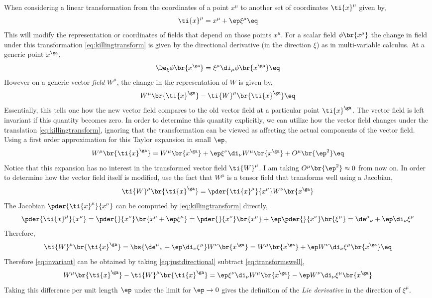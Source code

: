 \documentclass{article}
\begin{document}
When considering a linear transformation from the coordinates of a point $x^\mu$ to another set of coordinates $\ti{x}^\mu$ given by,
\[ \ti{x}^\mu = x^\mu + \ep \xi^\mu \eq \label{eq:killingtransform} \]
This will modify the representation or coordinates of fields that depend on those points $x^\mu$. For a scalar field $\phi \br{x^\mu}$ the change in field under this transformation \eqref{eq:killingtransform} is given by the directional derivative (in the direction $\xi$) as in multi-variable calculus. At a generic point $x^\ga$,
\[ \De_{\xi}\phi\br{x^\ga} = \xi^\mu \di_\mu \phi\br{x^\ga} \eq \label{eq:scalardirectional} \]
However on a generic vector \textit{field} $W^\mu$, the change in the representation of $W$ is given by,
\[ W^\mu \br{\ti{x}^\ga} - \ti{W}^\mu \br{\ti{x}^\ga} \eq \label{eq:invariant} \]
Essentially, this tells one how the new vector field compares to the old vector field at a particular point $\ti{x}^\ga$. The vector field is left invariant if this quantity becomes zero. In order to determine this quantity explicitly, we can utilize how the vector field changes under the translation \eqref{eq:killingtransform}, ignoring that the transformation can be viewed as affecting the actual components of the vector field. Using a first order approximation for this Taylor expansion in small $\ep$,
\[ W^\mu \br{\ti{x}^\ga} = W^\mu \br{x^\ga} + \ep \xi^\nu \di_\nu W^\mu \br{x^\ga} + O^\mu\br{\ep^2}  \eq \label{eq:justdirectional} \]
Notice that this expansion has no interest in the transformed vector field $\ti{W}^\mu$. I am taking $O^\mu\br{\ep^2} \approx 0$ from now on. In order to determine how the vector field itself is modified, use the fact that $W^\mu$ is a tensor field that transforms well using a Jacobian,
\[ \ti{W}^\mu \br{\ti{x}^\ga} = \pder{\ti{x}^\mu}{x^\nu} W^\nu \br{x^\ga} \]
The Jacobian $\pder{\ti{x}^\mu}{x^\nu}$ can be computed by \eqref{eq:killingtransform} directly,
\[ \pder{\ti{x}^\mu}{x^\nu} = \pder{}{x^\nu}\br{x^\mu + \ep \xi^\mu} = \pder{}{x^\nu}\br{x^\mu} + \ep \pder{}{x^\nu}\br{\xi^\mu} = {\de^\mu}_\nu + \ep \di_\nu \xi^\mu \]
Therefore,
\[ \ti{W}^\mu \br{\ti{x}^\ga} = \bs{{\de^\mu}_\nu + \ep \di_\nu \xi^\mu}W^\nu \br{x^\ga} = W^\mu \br{x^\ga} + \ep W^\nu \di_\nu \xi^\mu  \br{x^\ga} \eq \label{eq:transformswell}\]
Therefore \eqref{eq:invariant} can be obtained by taking \eqref{eq:justdirectional} subtract \eqref{eq:transformswell},
\[ W^\mu \br{\ti{x}^\ga} - \ti{W}^\mu \br{\ti{x}^\ga} = \ep \xi^\nu \di_\nu  W^\mu \br{x^\ga} -\ep W^\nu \di_\nu \xi^\mu \br{x^\ga} \]
Taking this difference per unit length $\ep$ under the limit for $\ep \to 0$ gives the definition of the \textit{Lie derivative} in the direction of $\xi^\mu$.
\end{document}
